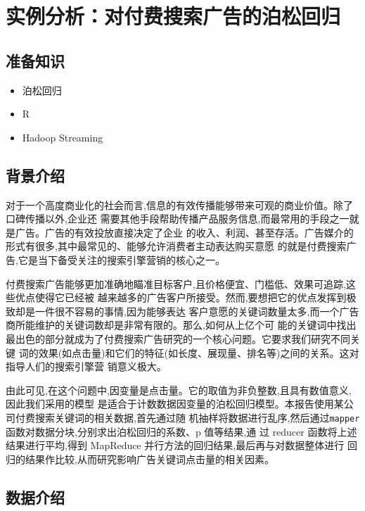 \section{实例分析：对付费搜索广告的泊松回归}\label{ux5b9eux4f8bux5206ux6790ux5bf9ux4ed8ux8d39ux641cux7d22ux5e7fux544aux7684ux6ccaux677eux56deux5f52}

\subsection{准备知识}\label{ux51c6ux5907ux77e5ux8bc6}

\begin{itemize}
\itemsep1pt\parskip0pt
\item
  泊松回归
\item
  R
\item
  Hadoop Streaming
\end{itemize}

\subsection{背景介绍}\label{ux80ccux666fux4ecbux7ecd}

对于一个高度商业化的社会而言,信息的有效传播能够带来可观的商业价值。除了口碑传播以外,企业还
需要其他手段帮助传播产品服务信息,而最常用的手段之一就是广告。广告的有效投放直接决定了企业
的收入、利润、甚至存活。广告媒介的形式有很多,其中最常见的、能够允许消费者主动表达购买意愿
的就是付费搜索广告,它是当下备受关注的搜索引擎营销的核心之一。

付费搜索广告能够更加准确地瞄准目标客户,且价格便宜、门槛低、效果可追踪,这些优点使得它已经被
越来越多的广告客户所接受。然而,要想把它的优点发挥到极致却是一件很不容易的事情,因为能够表达
客户意愿的关键词数量太多,而一个广告商所能维护的关键词数却是非常有限的。那么,如何从上亿个可
能的关键词中找出最出色的部分就成为了付费搜索广告研究的一个核心问题。它要求我们研究不同关键
词的效果(如点击量)和它们的特征(如长度、展现量、排名等)之间的关系。这对指导人们的搜索引擎营
销意义极大。

由此可见,在这个问题中,因变量是点击量。它的取值为非负整数,且具有数值意义,因此我们采用的模型
是适合于计数数据因变量的泊松回归模型。本报告使用某公司付费搜索关键词的相关数据,首先通过随
机抽样将数据进行乱序,然后通过\lstinline!mapper!函数对数据分块,分别求出泊松回归的系数、p
值等结果,通 过 reducer 函数将上述结果进行平均,得到 MapReduce
并行方法的回归结果,最后再与对数据整体进行
回归的结果作比较,从而研究影响广告关键词点击量的相关因素。

\subsection{数据介绍}\label{ux6570ux636eux4ecbux7ecd}

